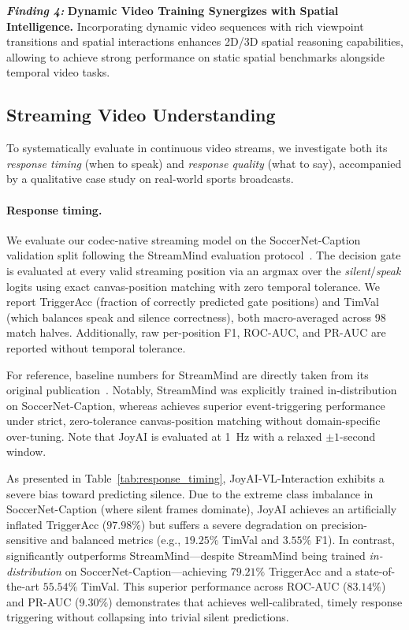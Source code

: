 \begin{promptbox}
\large
\textbf{\textit{Finding 4:}}
\textbf{Dynamic Video Training Synergizes with Spatial Intelligence.}
Incorporating dynamic video sequences with rich viewpoint transitions and spatial interactions enhances 2D/3D spatial reasoning capabilities, allowing \magevl to achieve strong performance on static spatial benchmarks alongside temporal video tasks.
\end{promptbox}


\subsection{Streaming Video Understanding}
\label{sec:streaming_video_understanding}

To systematically evaluate \magevl in continuous video streams, we investigate both its \emph{response timing} (when to speak) and \emph{response quality} (what to say), accompanied by a qualitative case study on real-world sports broadcasts.

\paragraph{Response timing.} 
We evaluate our codec-native streaming model on the SoccerNet-Caption validation split following the StreamMind evaluation protocol~\citep{ding2025streammindunlockingframerate}. The decision gate is evaluated at every valid streaming position via an $\mathrm{argmax}$ over the \emph{silent}/\emph{speak} logits using exact canvas-position matching with zero temporal tolerance. 
We report TriggerAcc (fraction of correctly predicted gate positions) and TimVal (which balances speak and silence correctness), both macro-averaged across 98 match halves. Additionally, raw per-position F1, ROC-AUC, and PR-AUC are reported without temporal tolerance. 

For reference, baseline numbers for StreamMind are directly taken from its original publication~\citep{ding2025streammindunlockingframerate}. Notably, StreamMind was explicitly trained in-distribution on SoccerNet-Caption, whereas \magevl achieves superior event-triggering performance under strict, zero-tolerance canvas-position matching without domain-specific over-tuning. Note that JoyAI is evaluated at 1~Hz with a relaxed $\pm1$-second window.

As presented in Table~\ref{tab:response_timing}, JoyAI-VL-Interaction exhibits a severe bias toward predicting silence. Due to the extreme class imbalance in SoccerNet-Caption (where silent frames dominate), JoyAI achieves an artificially inflated TriggerAcc ($97.98\%$) but suffers a severe degradation on precision-sensitive and balanced metrics (e.g., $19.25\%$ TimVal and $3.55\%$ F1). 
In contrast, \magevl significantly outperforms StreamMind—despite StreamMind being trained \emph{in-distribution} on SoccerNet-Caption—achieving $79.21\%$ TriggerAcc and a state-of-the-art $55.54\%$ TimVal. This superior performance across ROC-AUC ($83.14\%$) and PR-AUC ($9.30\%$) demonstrates that \magevl achieves well-calibrated, timely response triggering without collapsing into trivial silent predictions.


